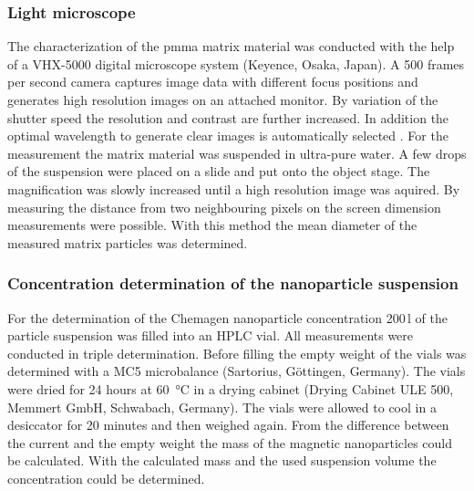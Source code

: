 \subsubsection{Light microscope}
\label{subsubsec:light_mic}
The characterization of the \gls{pmma} matrix material was conducted with the help of a VHX-5000 digital microscope system (Keyence, Osaka, Japan). A 500 frames per second camera captures image data with different focus positions and generates high resolution images on an attached monitor. By variation of the shutter speed the resolution and contrast are further increased. In addition the optimal wavelength to generate clear images is automatically selected \cite{VHX5000}. For the measurement the matrix material was suspended in ultra-pure water. A few drops of the suspension were placed on a slide and put onto the object stage. The magnification was slowly increased until a high resolution image was aquired. By measuring the distance from two neighbouring pixels on the screen dimension measurements were possible. With this method the mean diameter of the measured matrix particles was determined.    


\subsubsection{Concentration determination of the nanoparticle suspension}
\label{subsubsec:Conc_MF}
For the determination of the Chemagen nanoparticle concentration 200\,\textmu l of the particle suspension was filled into an HPLC vial. All measurements were conducted in triple determination. Before filling the empty weight of the vials was determined with a MC5 microbalance (Sartorius, Göttingen, Germany). The vials were dried for 24 hours at \SI{60}{\celsius} in a drying cabinet (Drying Cabinet ULE 500, Memmert GmbH, Schwabach, Germany). The vials were allowed to cool in a desiccator for 20 minutes and then weighed again. From the difference between the current and the empty weight the mass of the magnetic nanoparticles could be calculated. With the calculated mass and the used suspension volume the concentration could be determined.  


